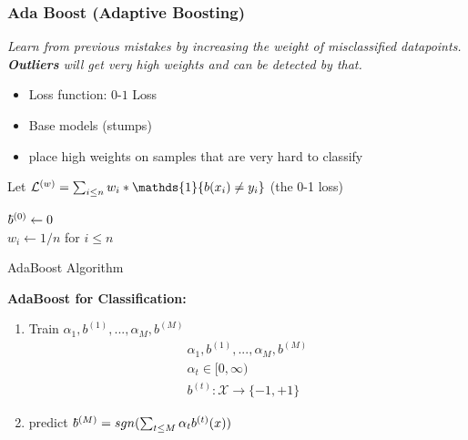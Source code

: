 \subsubsection{Ada Boost (Adaptive Boosting)}
\textit{Learn from previous mistakes by increasing the weight of misclassified datapoints. \textbf{Outliers} will get very high weights and can be detected by that.
}\begin{itemize}
	\item Loss function: $0$-$1$ Loss
	\item Base models (stumps)
	\item place high weights on samples that are very hard to classify
\end{itemize}



Let $\mathcal L^{(w)} = \sumin w_i * \mathds{1} \{b(x_i)\neq y_i\}$ (the 0-1 loss)

\begin{algorithm}[H]  
	$\bbar^{(0)} \gets 0$ \\ 
	$w_i \gets 1/n$ for $i\leq n$ \\
	\caption{AdaBoost Algorithm}
\end{algorithm}


\textbf{AdaBoost for Classification: } 
\begin{enumerate}
	\item Train $\alpha_1, b^{(1)}, ..., \alpha_M, b^{(M)}$
	\begin{equation*}
		\begin{gathered}
					\alpha_1, b^{(1)}, ..., \alpha_M, b^{(M)} \\
			\alpha_t \in [0, \infty) \\
			b^{(t)}: \mathcal X \to \{-1, +1\}
		\end{gathered}
	\end{equation*} 
	\item predict $\bbar^{(M)} = sgn(\sum_{t\leq M}\alpha_tb^{(t)}(x))$
\end{enumerate}

